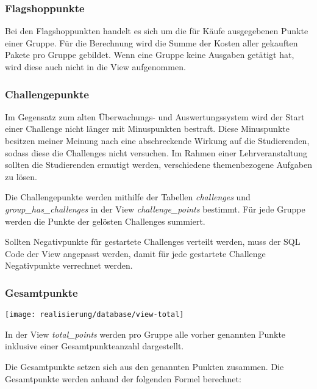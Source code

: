 \subsubsection{Flagshoppunkte}
Bei den Flagshoppunkten handelt es sich um die für Käufe ausgegebenen Punkte einer Gruppe.
Für die Berechnung wird die Summe der Kosten aller gekauften Pakete pro Gruppe gebildet.
Wenn eine Gruppe keine Ausgaben getätigt hat, wird diese auch nicht in die \linebreak View aufgenommen.

\subsubsection{Challengepunkte}
Im Gegensatz zum alten Überwachungs- und Auswertungssystem wird der Start einer Challenge nicht länger mit Minuspunkten bestraft. Diese Minuspunkte besitzen meiner Meinung nach eine abschreckende Wirkung auf die Studierenden, sodass diese die Challenges nicht versuchen. Im Rahmen einer Lehrveranstaltung sollten die Studierenden ermutigt werden, verschiedene themenbezogene Aufgaben zu lösen.

Die Challengepunkte werden mithilfe der Tabellen \textit{challenges} und \textit{group\_has\_challenges} in der View \textit{challenge\_points} bestimmt. Für jede Gruppe werden die Punkte der gelösten \linebreak Challenges summiert.

Sollten Negativpunkte für gestartete Challenges verteilt werden, muss der SQL Code der View angepasst werden, damit für jede gestartete Challenge Negativpunkte verrechnet werden. 

\subsubsection{Gesamtpunkte}
\begin{center}
	\texttt{[image: realisierung/database/view-total]}
	\label{fig:realisierung-view-total}
\end{center}

In der View \textit{total\_points} werden pro Gruppe alle vorher genannten Punkte inklusive einer Gesamtpunkteanzahl dargestellt. 

Die Gesamtpunkte setzen sich aus den genannten Punkten zusammen. Die Gesamtpunkte \linebreak werden anhand der folgenden Formel berechnet:


